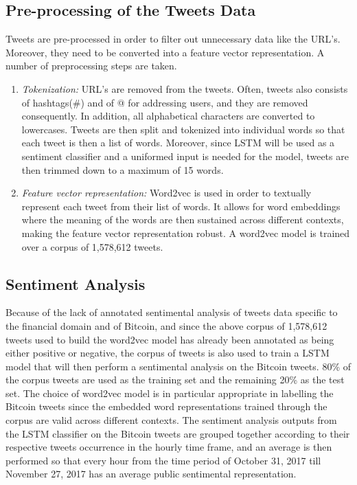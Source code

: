 \documentclass[conference]{IEEEtran}
\begin{document}
\subsection{Pre-processing of the Tweets Data}
\par Tweets are pre-processed in order to filter out unnecessary data like the URL's. Moreover, they need to be converted into a feature vector representation. A number of preprocessing steps are taken.
\begin{enumerate}
\item \textit{Tokenization:} URL's are removed from the tweets. Often, tweets also consists of hashtags(\#) and of @ for addressing users, and they are removed consequently. In addition, all alphabetical characters are converted to lowercases. Tweets are then split and tokenized into individual words so that each tweet is then a list of words. Moreover, since LSTM will be used as a sentiment classifier and a uniformed input is needed for the model, tweets are then trimmed down to a maximum of 15 words.

\item \textit{Feature vector representation:} Word2vec is used in order to textually represent each tweet from their list of words. It allows for word embeddings where the meaning of the words are then sustained across different contexts, making the feature vector representation robust. A word2vec model is trained over a corpus of 1,578,612 tweets.
\end{enumerate}

\subsection{Sentiment Analysis}
\par Because of the lack of annotated sentimental analysis of tweets data specific to the financial domain and of Bitcoin, and since the above corpus of 1,578,612 tweets used to build the word2vec model has already been annotated as being either positive or negative, the corpus of tweets is also used to train a LSTM model that will then perform a sentimental analysis on the Bitcoin tweets. 80\% of the corpus tweets are used as the training set and the remaining 20\% as the test set. The choice of word2vec model is in particular appropriate in labelling the Bitcoin tweets since the embedded word representations trained through the corpus are valid across different contexts. The sentiment analysis outputs from the LSTM classifier on the Bitcoin tweets are grouped together according to their respective tweets occurrence in the hourly time frame, and an average is then performed so that every hour from the time period of October 31, 2017 till November 27, 2017 has an average public sentimental representation.  
\end{document}
